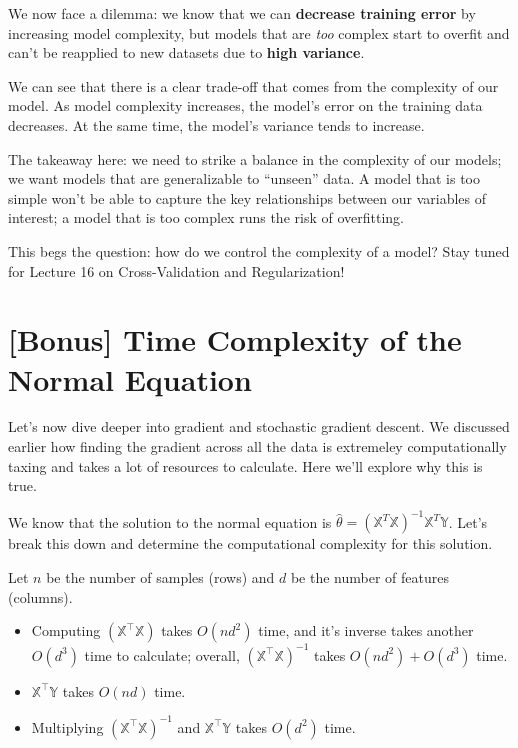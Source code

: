 \documentclass[
  letterpaper,
  DIV=11,
  numbers=noendperiod]{scrreprt}
\providecommand{\tightlist}{%
  \setlength{\itemsep}{0pt}\setlength{\parskip}{0pt}}\usepackage{longtable,booktabs,array}
\begin{document}
We now face a dilemma: we know that we can \textbf{decrease training
error} by increasing model complexity, but models that are \emph{too}
complex start to overfit and can't be reapplied to new datasets due to
\textbf{high variance}.

We can see that there is a clear trade-off that comes from the
complexity of our model. As model complexity increases, the model's
error on the training data decreases. At the same time, the model's
variance tends to increase.

The takeaway here: we need to strike a balance in the complexity of our
models; we want models that are generalizable to ``unseen'' data. A
model that is too simple won't be able to capture the key relationships
between our variables of interest; a model that is too complex runs the
risk of overfitting.

This begs the question: how do we control the complexity of a model?
Stay tuned for Lecture 16 on Cross-Validation and Regularization!

\section{{[}Bonus{]} Time Complexity of the Normal
Equation}\label{bonus-time-complexity-of-the-normal-equation}

Let's now dive deeper into gradient and stochastic gradient descent. We
discussed earlier how finding the gradient across all the data is
extremeley computationally taxing and takes a lot of resources to
calculate. Here we'll explore why this is true.

We know that the solution to the normal equation is
\(\hat{\theta} = (\mathbb{X}^T\mathbb{X})^{-1}\mathbb{X}^T\mathbb{Y}\).
Let's break this down and determine the computational complexity for
this solution.

Let \(n\) be the number of samples (rows) and \(d\) be the number of
features (columns).

\begin{itemize}
\tightlist
\item
  Computing \((\mathbb{X}^{\top}\mathbb{X})\) takes \(O(nd^2)\) time,
  and it's inverse takes another \(O(d^3)\) time to calculate; overall,
  \((\mathbb{X}^{\top}\mathbb{X})^{-1}\) takes \(O(nd^2) + O(d^3)\)
  time.
\item
  \(\mathbb{X}^{\top}\mathbb{Y}\) takes \(O(nd)\) time.
\item
  Multiplying \((\mathbb{X}^{\top}\mathbb{X})^{-1}\) and
  \(\mathbb{X}^{\top}\mathbb{Y}\) takes \(O(d^2)\) time.
\end{itemize}
\end{document}
